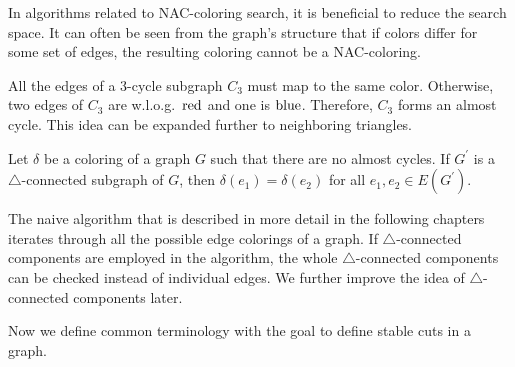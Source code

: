 In algorithms related to NAC-coloring search, it is beneficial
to reduce the search space.
It can often be seen from the graph's structure
that if colors differ for some set of edges,
the resulting coloring cannot be a NAC-coloring.

All the edges of a 3-cycle subgraph \( C_3 \) must map to the same color.
Otherwise, two edges of \( C_3 \) are w.l.o.g.\ \( \text{red} \) and one is \( \text{blue} \).
Therefore, \( C_3 \) forms an almost cycle.
This idea can be expanded further to neighboring triangles.
%
%
\begin{lemma}
	Let \( \delta \) be a coloring of a graph \( G \) such that there are
	no almost cycles. If \( G^\prime \) is
	a \( \triangle \)-connected subgraph of \( G \),
	then \( \delta(e_1) = \delta(e_2) \) for all \( e_1, e_2 \in E(G^\prime) \).
\end{lemma}
%
The naive algorithm that is described in more detail in the following chapters
iterates through all the possible edge colorings of a graph.
If \( \triangle \)-connected components are employed in the algorithm,
the whole \( \triangle \)-connected components can be checked instead of individual edges.
We further improve the idea of \( \triangle \)-connected components later.

Now we define common terminology with the goal to define stable cuts in a graph.

